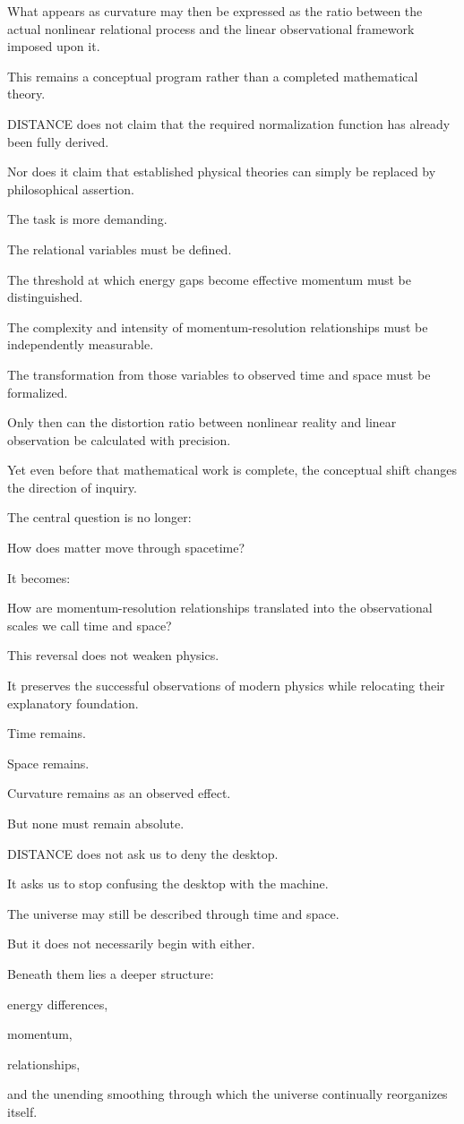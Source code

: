 What appears as curvature may then be expressed as the ratio between the actual nonlinear relational process and the linear observational framework imposed upon it.

This remains a conceptual program rather than a completed mathematical theory.

DISTANCE does not claim that the required normalization function has already been fully derived.

Nor does it claim that established physical theories can simply be replaced by philosophical assertion.

The task is more demanding.

The relational variables must be defined.

The threshold at which energy gaps become effective momentum must be distinguished.

The complexity and intensity of momentum-resolution relationships must be independently measurable.

The transformation from those variables to observed time and space must be formalized.

Only then can the distortion ratio between nonlinear reality and linear observation be calculated with precision.

Yet even before that mathematical work is complete, the conceptual shift changes the direction of inquiry.

The central question is no longer:

How does matter move through spacetime?

It becomes:

How are momentum-resolution relationships translated into the observational scales we call time and space?

This reversal does not weaken physics.

It preserves the successful observations of modern physics while relocating their explanatory foundation.

Time remains.

Space remains.

Curvature remains as an observed effect.

But none must remain absolute.

DISTANCE does not ask us to deny the desktop.

It asks us to stop confusing the desktop with the machine.

The universe may still be described through time and space.

But it does not necessarily begin with either.

Beneath them lies a deeper structure:

energy differences,

momentum,

relationships,

and the unending smoothing through which the universe continually reorganizes itself.
